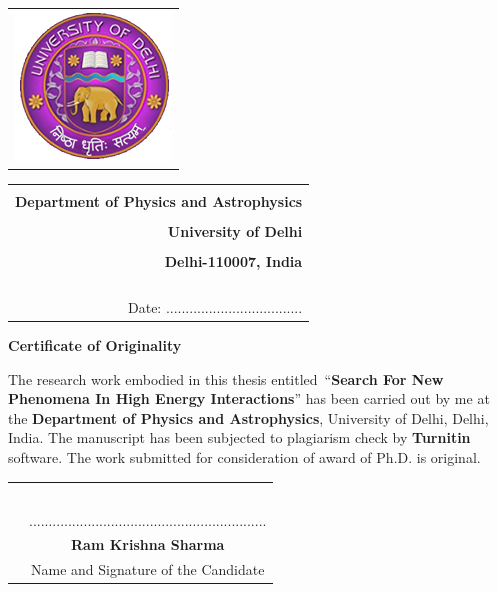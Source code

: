 %
\begin{tabular}{l}
\includegraphics[scale=0.7]{figures/logo_du.jpg}
\end{tabular}
%
\hspace{3cm}
\begin{tabular}{r}
 \\
 \\
\color{blue} \textbf{Department of Physics  and Astrophysics} \\
 \\
\textbf{University of Delhi} \\
 \\
\textbf{Delhi-110007, India} \\
 \\
 \\
 \\
 \\
Date: ...................................  
\end{tabular}
%
\vspace{4cm}
\begin{center}
\textbf{\LARGE Certificate of Originality}
\end{center}
\vspace{1.5cm}
%
The research work embodied in this thesis entitled~``\textbf{Search For New Phenomena In High Energy Interactions}'' has been carried out by me at the \textbf{Department of Physics and Astrophysics}, University of Delhi, Delhi, India. The manuscript has been subjected to plagiarism check by \textbf{Turnitin} software. The work submitted for consideration of award of Ph.D. is original. \\
\begin{tabular}{cc}
 & \\
 & \\
 & \\
 & \\
 & \\
 & \hspace{9cm} ............................................................. \\
 & \hspace{9cm} \textbf{Ram Krishna Sharma} \\
 & \hspace{8.5cm} Name and Signature of the Candidate
\end{tabular}